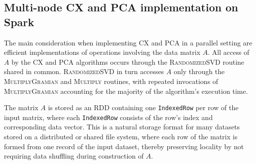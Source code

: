 \subsection{Multi-node CX and PCA implementation on Spark}
\label{sec:cx_spark}
The main consideration when implementing CX and PCA in a parallel setting are
efficient implementations of operations involving the data matrix $A$.
All access of $A$ by the CX and PCA algorithms occurs through the
\textsc{RandomizedSVD} routine shared in common.
\textsc{RandomizedSVD} in turn accesses $A$ only through the \textsc{MultiplyGramian} and
\textsc{Multiply} routines, with repeated invocations of \textsc{MultiplyGramian}
accounting for the majority of the algorithm's execution time.

The matrix $A$ is stored as an RDD containing one \texttt{IndexedRow} per row of the input matrix,
where each \texttt{IndexedRow} consists of the row's index and corresponding data vector.
This is a natural storage format for many datasets stored on a distributed or shared file
system, where each row of the matrix is formed from one record of the
input dataset, thereby preserving locality by not requiring data shuffling
during construction of $A$.

